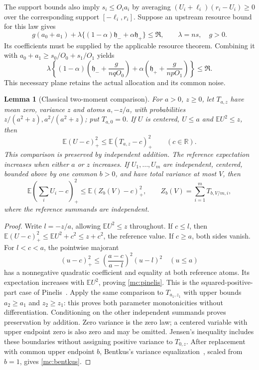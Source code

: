 \documentclass[aop,preprint]{imsart}
\newtheorem{lemma}[theorem]{Lemma}
\theoremstyle{definition}
\newcommand{\E}{\mathbb E}
\numberwithin{equation}{section}
\begin{document}
The support bounds also imply $s_i\le O_i a_i$ by averaging
$(U_i+\ell_i)(r_i-U_i)\ge0$ over the corresponding support
$[-\ell_i,r_i]$. Suppose an upstream resource bound for this law gives
\[
 g(a_0+a_1)+\lambda\{(1-\alpha)\mathfrak h_-
                         +\alpha\mathfrak h_+\}\le\mathfrak R,
 \qquad \lambda=ns,\quad g>0.
\]
Its coefficients must be supplied by the applicable resource theorem.
Combining it with $a_0+a_1\ge s_0/O_0+s_1/O_1$ yields
\begin{equation}\label{mc:signed-plane}
 \lambda\left\{(1-\alpha)
       \left(\mathfrak h_-+\frac g{nqO_0}\right)
 +\alpha\left(\mathfrak h_++\frac g{npO_1}\right)\right\}
 \le\mathfrak R.
\end{equation}
This necessary plane retains the actual allocation and its common noise.

\begin{lemma}[Classical two-moment comparison]\label{mc:two-moment}
For $a>0$, $z\ge0$, let $T_{a,z}$ have mean zero, variance $z$
and atoms $a,-z/a$, with probabilities
$z/(a^2+z),a^2/(a^2+z)$; put $T_{a,0}=0$.
If $U$ is centered, $U\le a$ and $\E U^2\le z$, then
\begin{equation}\label{mc:pinelis}
 \E(U-c)_+^2\le\E(T_{a,z}-c)_+^2\qquad(c\in\mathbb R).
\end{equation}
This comparison is preserved by independent addition. The reference
expectation increases when either $a$ or $z$ increases.
If $U_1,\ldots,U_m$ are independent, centered, bounded above by
one common $b>0$, and have total variance at most $V$, then
\begin{equation}\label{mc:bentkus}
 \E\left(\sum_i U_i-c\right)_+^2
 \le \E(Z_b(V)-c)_+^2,
 \qquad Z_b(V)=\sum_{i=1}^mT_{b,V/m,i},
\end{equation}
where the reference summands are independent.
\end{lemma}
\begin{proof}
Write $l=-z/a$, allowing $\E U^2\le z$ throughout.
If $c\le l$, then $\E(U-c)_+^2\le\E U^2+c^2\le z+c^2$,
the reference value. If $c\ge a$, both
sides vanish. For $l<c<a$, the pointwise majorant
\[
 (u-c)_+^2\le\left(\frac{a-c}{a-l}\right)^2(u-l)^2
 \quad(u\le a)
\]
has a nonnegative quadratic coefficient and equality at both reference
atoms. Its expectation increases with $\E U^2$, proving
\eqref{mc:pinelis}. This is the squared-positive-part case of
Pinelis~\cite[Lemma~3.2 and Theorem~2.1]{Pinelis2006}.
Apply the same comparison to $T_{a_1,z_1}$ with upper bounds
$a_2\ge a_1$ and $z_2\ge z_1$: this proves both parameter
monotonicities without differentiation. Conditioning on the other
independent summands proves preservation by addition. Zero variance
is the zero law; a centered variable with upper endpoint zero is
also zero and may be omitted. Jensen's inequality includes these
boundaries without assigning positive variance to $T_{0,z}$.
After replacement with common upper endpoint $b$, Bentkus's
variance equalization~\cite[Lemma~4.5]{Bentkus2004}, scaled from
$b=1$, gives \eqref{mc:bentkus}.
\end{proof}
\end{document}
